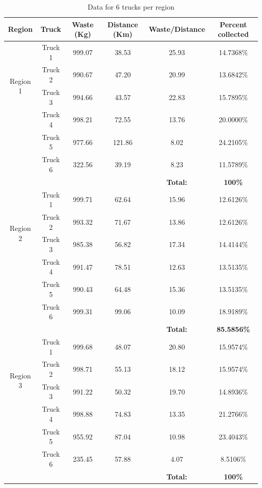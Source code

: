 \documentclass[12pt]{article}
\begin{document}
\begin{table}[H]
    \centering
    \caption{ Data for 6 trucks per region} \label{tab2}
    \vspace*{0.3cm}
    \begin{tabular}{|c|c|c|c|c|c|}
        \hline Region & Truck & Waste (Kg) & Distance (Km) & Waste/Distance & Percent collected \\
        \hline \multirow{4}{*}{Region 1} & Truck 1 & 999.07& 38.53 & 25.93 &14.7368\% \\
        \cline{2-6}& Truck 2 & 990.67 & 47.20 & 20.99 & 13.6842\%\\        
        \cline{2-6}& Truck 3 & 994.66 & 43.57 & 22.83 & 15.7895\%\\        
        \cline{2-6}& Truck 4 & 998.21 & 72.55 & 13.76 & 20.0000\%\\      
        \cline{2-6}& Truck 5 & 977.66 & 121.86 & 8.02 & 24.2105\%\\      
        \cline{2-6}& Truck 6 & 322.56 & 39.19 & 8.23 & 11.5789\%\\
        \hline & & & &\textbf{Total:} &\textbf{100\%}\\
        \hline \multirow{4}{*}{Region 2} & Truck 1 & 999.71 & 62.64 & 15.96 & 12.6126\% \\
        \cline{2-6}& Truck 2 & 993.32 & 71.67 & 13.86 & 12.6126\%\\        
        \cline{2-6}& Truck 3 & 985.38 & 56.82 & 17.34 & 14.4144\%\\        
        \cline{2-6}& Truck 4 & 991.47 & 78.51 & 12.63 & 13.5135\%\\        
        \cline{2-6}& Truck 5 & 990.43 & 64.48 & 15.36 & 13.5135\%\\        
        \cline{2-6}& Truck 6 & 999.31 & 99.06 & 10.09 & 18.9189\%\\
        \hline & & & &\textbf{Total:} &\textbf{85.5856\%}\\     
        \hline \multirow{4}{*}{Region 3} & Truck 1 & 999.68 & 48.07 & 20.80 & 15.9574\% \\
        \cline{2-6}& Truck 2 & 998.71 & 55.13 & 18.12 & 15.9574\%\\        
        \cline{2-6}& Truck 3 & 991.22 & 50.32 & 19.70 & 14.8936\%\\        
        \cline{2-6}& Truck 4 & 998.88 & 74.83 & 13.35 & 21.2766\%\\      
        \cline{2-6}& Truck 5 & 955.92 & 87.04 & 10.98 & 23.4043\%\\      
        \cline{2-6}& Truck 6 & 235.45 & 57.88 & 4.07 & 8.5106\%\\
        \hline & & & &\textbf{Total:} &\textbf{100\%}\\
        \hline      
    \end{tabular}
\end{table}
\end{document}
